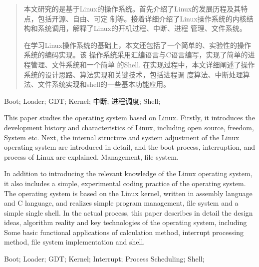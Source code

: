 \documentclass{swfuthesis}
\begin{document}
\maketitle
\frontmatter

\begin{abstract} %
  本文研究的是基于Linux的操作系统。首先介绍了Linux的发展历程及其特点，包括开源、自由、可定
  制等。接着详细介绍了Linux操作系统的内核结构和系统调用，解释了Linux的开机过程、中断、进程
  管理、文件系统。

  在学习Linux操作系统的基础上，本文还包括了一个简单的、实验性的操作系统的编码实现。该
  操作系统采用汇编语言与C语言编写，实现了简单的进程管理、文件系统和一个简单
  的Shell. 在实现过程中，本文详细阐述了操作系统的设计思路、算法实现和关键技术，包括进程调
  度算法、中断处理算法、文件系统实现和shell的一些基本功能应用。
\end{abstract}

\begin{keyword} %
Boot; Loader; GDT; Kernel; 中断; 进程调度; Shell;
\end{keyword}

\begin{EAbstract}
  This paper studies the operating system based on Linux. Firstly, it introduces the development history and characteristics of Linux, including open source, freedom,
  System etc. Next, the internal structure and system adjustment of the Linux operating system are introduced in detail, and the boot process, interruption, and process of Linux are explained.
  Management, file system.

  In addition to introducing the relevant knowledge of the Linux operating system, it also includes a simple, experimental coding practice of the operating system.
  The operating system is based on the Linux kernel, written in assembly language and C language, and realizes simple program management, file system and a simple single
  shell. In the actual process, this paper describes in detail the design ideas, algorithm reality and key technologies of the operating system, including
  Some basic functional applications of calculation method, interrupt processing method, file system implementation and shell.
\end{EAbstract}
\begin{EKeyword}
Boot; Loader; GDT; Kernel; Interrupt; Process Scheduling; Shell;  
\end{EKeyword}

\tableofcontents     %
\cleardoublepage %
\end{document}
